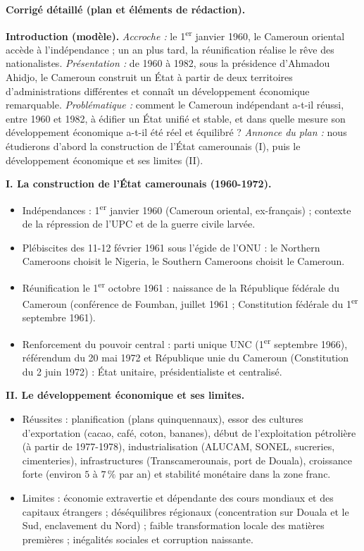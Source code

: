 \documentclass[11pt]{article}
\begin{document}
\begin{corrige}
\textbf{Corrigé détaillé (plan et éléments de rédaction).}

\textbf{Introduction (modèle).} \emph{Accroche :} le 1\textsuperscript{er} janvier 1960, le Cameroun oriental accède à l'indépendance ; un an plus tard, la réunification réalise le rêve des nationalistes. \emph{Présentation :} de 1960 à 1982, sous la présidence d'Ahmadou Ahidjo, le Cameroun construit un État à partir de deux territoires d'administrations différentes et connaît un développement économique remarquable. \emph{Problématique :} comment le Cameroun indépendant a-t-il réussi, entre 1960 et 1982, à édifier un État unifié et stable, et dans quelle mesure son développement économique a-t-il été réel et équilibré ? \emph{Annonce du plan :} nous étudierons d'abord la construction de l'État camerounais (I), puis le développement économique et ses limites (II).

\textbf{I. La construction de l'État camerounais (1960-1972).}
\begin{itemize}
\item Indépendances : 1\textsuperscript{er} janvier 1960 (Cameroun oriental, ex-français) ; contexte de la répression de l'UPC et de la guerre civile larvée.
\item Plébiscites des 11-12 février 1961 sous l'égide de l'ONU : le Northern Cameroons choisit le Nigeria, le Southern Cameroons choisit le Cameroun.
\item Réunification le 1\textsuperscript{er} octobre 1961 : naissance de la République fédérale du Cameroun (conférence de Foumban, juillet 1961 ; Constitution fédérale du 1\textsuperscript{er} septembre 1961).
\item Renforcement du pouvoir central : parti unique UNC (1\textsuperscript{er} septembre 1966), référendum du 20 mai 1972 et République unie du Cameroun (Constitution du 2 juin 1972) : État unitaire, présidentialiste et centralisé.
\end{itemize}

\textbf{II. Le développement économique et ses limites.}
\begin{itemize}
\item Réussites : planification (plans quinquennaux), essor des cultures d'exportation (cacao, café, coton, bananes), début de l'exploitation pétrolière (à partir de 1977-1978), industrialisation (ALUCAM, SONEL, sucreries, cimenteries), infrastructures (Transcamerounais, port de Douala), croissance forte (environ $5$ à $7\,\%$ par an) et stabilité monétaire dans la zone franc.
\item Limites : économie extravertie et dépendante des cours mondiaux et des capitaux étrangers ; déséquilibres régionaux (concentration sur Douala et le Sud, enclavement du Nord) ; faible transformation locale des matières premières ; inégalités sociales et corruption naissante.
\end{itemize}


\end{corrige}
\end{document}
